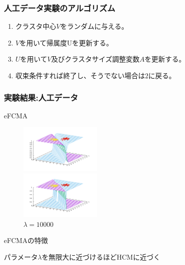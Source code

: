 \documentclass[13pt,dvipdfmx]{beamer}
\begin{document}
\begin{frame}\frametitle{人工データ実験のアルゴリズム}
  \begin{enumerate}
  \item クラスタ中心$V$をランダムに与える。
  \item $V$を用いて帰属度Uを更新する。
  \item $U$を用いて$V$及びクラスタサイズ調整変数$A$を更新する。
  \item 収束条件すれば終了し、そうでない場合は$2$に戻る。
  \end{enumerate}
\end{frame}

\begin{frame}\frametitle{実験結果:人工データ}
  \begin{block}{eFCMA}
    \begin{figure}[htbp]
      \begin{minipage}{0.4\hsize}
        \begin{center}
          \includegraphics[width=40mm]{eFCMA-Lambda1.png}
        \end{center}
        \captionsetup{labelformat=empty,labelsep=none}
        \caption{$\lambda=1$}
        \label{fig:one}
      \end{minipage}
      \hspace{1cm}
      \begin{minipage}{0.4\hsize}
        \begin{center}
          \includegraphics[width=40mm]{eFCMA-Lambda10000.png}
        \end{center}
        \captionsetup{labelformat=empty,labelsep=none}
        \caption{$\lambda=10000$}
        \label{fig:two}
      \end{minipage}
    \end{figure}
  \end{block}
  \begin{block}{eFCMAの特徴}
    \begin{center}
      パラメータ$\lambda$を無限大に近づけるほどHCMに近づく
    \end{center}
  \end{block}
\end{frame}
\end{document}
